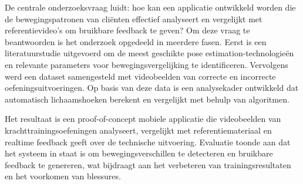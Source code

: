 \medskip

De centrale onderzoeksvraag luidt: hoe kan een applicatie ontwikkeld worden die de bewegingspatronen van cliënten effectief analyseert en vergelijkt met referentievideo’s om bruikbare feedback te geven? Om deze vraag te beantwoorden is het onderzoek opgedeeld in meerdere fasen. 
Eerst is een literatuurstudie uitgevoerd om de meest geschikte pose estimation-technologieën en relevante parameters voor bewegingsvergelijking te identificeren. 
Vervolgens werd een dataset samengesteld met videobeelden van correcte en incorrecte oefeningsuitvoeringen. 
Op basis van deze data is een analysekader ontwikkeld dat automatisch lichaamshoeken berekent en vergelijkt met behulp van algoritmen.

\medskip

Het resultaat is een proof-of-concept mobiele applicatie die videobeelden van krachttrainingsoefeningen analyseert, vergelijkt met referentiemateriaal en realtime feedback geeft over de technische uitvoering. 
Evaluatie toonde aan dat het systeem in staat is om bewegingsverschillen te detecteren en bruikbare feedback te genereren, wat bijdraagt aan het verbeteren van trainingsresultaten en het voorkomen van blessures.

